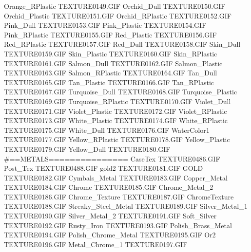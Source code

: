 Orange_RPlastic                TEXTURE\TEX0149.GIF
Orchid_Dull                    TEXTURE\TEX0150.GIF
Orchid_Plastic                 TEXTURE\TEX0151.GIF
Orchid_RPlastic                TEXTURE\TEX0152.GIF
Pink_Dull                      TEXTURE\TEX0153.GIF
Pink_Plastic                   TEXTURE\TEX0154.GIF
Pink_RPlastic                  TEXTURE\TEX0155.GIF
Red_Plastic                    TEXTURE\TEX0156.GIF
Red_RPlastic                   TEXTURE\TEX0157.GIF
Red_Dull                       TEXTURE\TEX0158.GIF
Skin_Dull                      TEXTURE\TEX0159.GIF
Skin_Plastic                   TEXTURE\TEX0160.GIF
Skin_RPlastic                  TEXTURE\TEX0161.GIF
Salmon_Dull                    TEXTURE\TEX0162.GIF
Salmon_Plastic                 TEXTURE\TEX0163.GIF
Salmon_RPlastic                TEXTURE\TEX0164.GIF
Tan_Dull                       TEXTURE\TEX0165.GIF
Tan_Plastic                    TEXTURE\TEX0166.GIF
Tan_RPlastic                   TEXTURE\TEX0167.GIF
Turquoise_Dull                 TEXTURE\TEX0168.GIF
Turquoise_Plastic              TEXTURE\TEX0169.GIF
Turquoise_RPlastic             TEXTURE\TEX0170.GIF
Violet_Dull                    TEXTURE\TEX0171.GIF
Violet_Plastic                 TEXTURE\TEX0172.GIF
Violet_RPlastic                TEXTURE\TEX0173.GIF
White_Plastic                  TEXTURE\TEX0174.GIF
White_RPlastic                 TEXTURE\TEX0175.GIF
White_Dull                     TEXTURE\TEX0176.GIF
WaterColor1                    TEXTURE\TEX0177.GIF
Yellow_RPlastic                TEXTURE\TEX0178.GIF
Yellow_Plastic                 TEXTURE\TEX0179.GIF
Yellow_Dull                    TEXTURE\TEX0180.GIF
#==METALS===============
CaseTex                        TEXTURE\TEX0486.GIF
Post_Tex                       TEXTURE\TEX0488.GIF
gold2                          TEXTURE\TEX0181.GIF
GOLD                           TEXTURE\TEX0182.GIF
Cymbals_Metal                  TEXTURE\TEX0183.GIF
Copper_Metal                   TEXTURE\TEX0184.GIF
Chrome                         TEXTURE\TEX0185.GIF
Chrome_Metal_2                 TEXTURE\TEX0186.GIF
Chrome_Texture                 TEXTURE\TEX0187.GIF
ChromeTexture                  TEXTURE\TEX0188.GIF
Streaky_Steel_Metal            TEXTURE\TEX0189.GIF
Silver_Metal_1                 TEXTURE\TEX0190.GIF
Silver_Metal_2                 TEXTURE\TEX0191.GIF
Soft_Silver                    TEXTURE\TEX0192.GIF
Rusty_Iron                     TEXTURE\TEX0193.GIF
Polish_Brass_Metal             TEXTURE\TEX0194.GIF
Polish_Chrome_Metal            TEXTURE\TEX0195.GIF
Or2                            TEXTURE\TEX0196.GIF
Metal_Chrome_1                 TEXTURE\TEX0197.GIF
